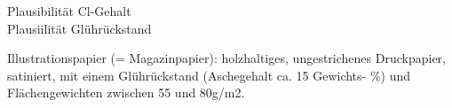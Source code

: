 Plausibilität Cl-Gehalt\\

Plausiilität Glührückstand

Illustrationspapier (= Magazinpapier): holzhaltiges, ungestrichenes Druckpapier, satiniert, mit einem Glührückstand (Aschegehalt ca. 15 Gewichts- \%) und Flächengewichten zwischen 55 und 80g/m2. 
\cite{Schwarzboeck2018}

%

